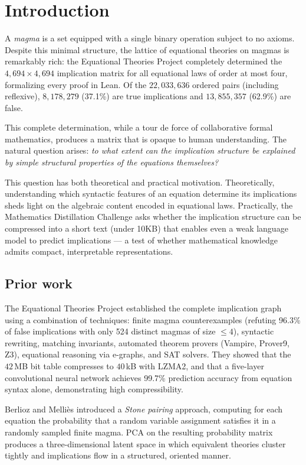 \section{Introduction}\label{sec:intro}

A \emph{magma} is a set equipped with a single binary operation subject to no
axioms.  Despite this minimal structure, the lattice of equational theories on
magmas is remarkably rich: the Equational Theories Project \cite{ETP2025}
completely determined the $4{,}694 \times 4{,}694$ implication matrix for all
equational laws of order at most four, formalizing every proof in Lean.  Of the
$22{,}033{,}636$ ordered pairs (including reflexive), $8{,}178{,}279$ (37.1\%)
are true implications and $13{,}855{,}357$ (62.9\%) are false.

This complete determination, while a tour de force of collaborative formal
mathematics, produces a matrix that is opaque to human understanding.  The
natural question arises: \emph{to what extent can the implication structure be
explained by simple structural properties of the equations themselves?}

This question has both theoretical and practical motivation.  Theoretically,
understanding which syntactic features of an equation determine its
implications sheds light on the algebraic content encoded in equational laws.
Practically, the Mathematics Distillation Challenge \cite{Tao2026blog,SAIR2026}
asks whether the implication structure can be compressed into a short text
(under 10KB) that enables even a weak language model to predict implications
--- a test of whether mathematical knowledge admits compact, interpretable
representations.

\subsection{Prior work}
The Equational Theories Project \cite{ETP2025} established the complete
implication graph using a combination of techniques: finite magma
counterexamples (refuting 96.3\% of false implications with only 524 distinct
magmas of size $\le 4$), syntactic rewriting, matching invariants, automated
theorem provers (Vampire, Prover9, Z3), equational reasoning via e-graphs, and
SAT solvers.  They showed that the $42$\,MB bit table compresses to $40$\,kB
with LZMA2, and that a five-layer convolutional neural network achieves 99.7\%
prediction accuracy from equation syntax alone, demonstrating high
compressibility.

Berlioz and Melli\`{e}s \cite{BM2026} introduced a \emph{Stone pairing}
approach, computing for each equation the probability that a random variable
assignment satisfies it in a randomly sampled finite magma.  PCA on the
resulting probability matrix produces a three-dimensional latent space in which
equivalent theories cluster tightly and implications flow in a structured,
oriented manner.

